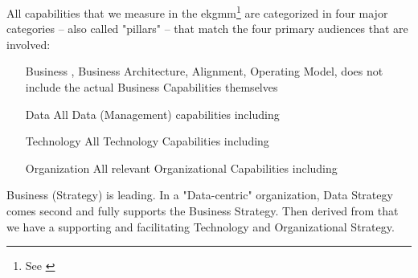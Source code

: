 All capabilities that we measure in the \gls{ekgmm}\footnote{See \cite{ekgmm}} are categorized
in four major categories -- also called "pillars" -- that match the four primary audiences that are involved:

\begin{enumerate}[leftmargin=1in,font=\bfseries]
    \item [Business]     , Business Architecture, Alignment, Operating Model,
                         does not include the actual Business Capabilities themselves
    \item [Data]         All Data (Management) capabilities including 
    \item [Technology]   All Technology Capabilities including 
    \item [Organization] All relevant Organizational Capabilities including 
\end{enumerate}

Business (Strategy) is leading.
In a "Data-centric" organization, Data Strategy comes second and fully supports the Business Strategy.
Then derived from that we have a supporting and facilitating Technology and Organizational Strategy.

